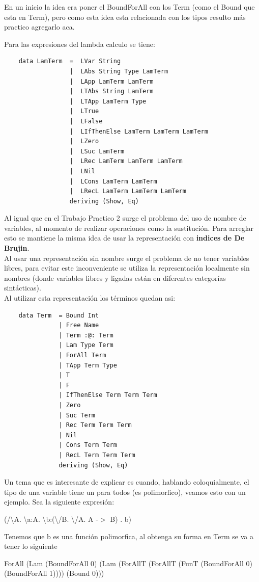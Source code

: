 \documentclass[12pt, titlepage, a4paper]{article}
\begin{document}
En un inicio la idea era poner el BoundForAll con los Term (como el Bound que esta en Term), pero como esta idea esta relacionada con 
los tipos resulto más practico agregarlo aca.

\noindent Para las expresiones del lambda calculo se tiene:
\begin{verbatim}
    data LamTerm  =  LVar String
                  |  LAbs String Type LamTerm
                  |  LApp LamTerm LamTerm
                  |  LTAbs String LamTerm
                  |  LTApp LamTerm Type
                  |  LTrue 
                  |  LFalse
                  |  LIfThenElse LamTerm LamTerm LamTerm
                  |  LZero
                  |  LSuc LamTerm
                  |  LRec LamTerm LamTerm LamTerm
                  |  LNil
                  |  LCons LamTerm LamTerm
                  |  LRecL LamTerm LamTerm LamTerm
                  deriving (Show, Eq)
\end{verbatim}

Al igual que en el Trabajo Practico 2 \cite{tp2:lambdaCalculoSimpleTipado} surge el problema del uso de nombre de variables, al 
momento de realizar operaciones como la sustitución. Para arreglar esto se mantiene la misma idea de 
usar la representación con \textbf{indices de De Brujin}. \\

Al usar una representación sin nombre surge el problema de no tener variables libres,  
para evitar este inconveniente se utiliza la representación localmente sin nombres (donde variables libres y ligadas están 
en diferentes categorías sintácticas). \\

\noindent Al utilizar esta representación los términos quedan asi:
\begin{verbatim}
    data Term  = Bound Int
               | Free Name 
               | Term :@: Term
               | Lam Type Term
               | ForAll Term
               | TApp Term Type
               | T
               | F
               | IfThenElse Term Term Term
               | Zero
               | Suc Term
               | Rec Term Term Term
               | Nil
               | Cons Term Term
               | RecL Term Term Term
               deriving (Show, Eq)
\end{verbatim}


Un tema que es interesante de explicar es cuando, hablando coloquialmente, el tipo de una variable tiene un para todos (es polimorfico), 
veamos esto con un ejemplo. Sea la siguiente expresión:
\begin{center}
  (/\textbackslash A. \textbackslash a:A. \textbackslash b:(\textbackslash/B. \textbackslash/A. A -$>$ B) . b) 
\end{center}
Tenemos que b es una función polimorfica, al obtenga su forma en Term se va a tener lo siguiente
\begin{center}
  ForAll (Lam (BoundForAll 0) (Lam (ForAllT (ForAllT (FunT (BoundForAll 0) (BoundForAll 1)))) (Bound 0)))
\end{center}
\end{document}
